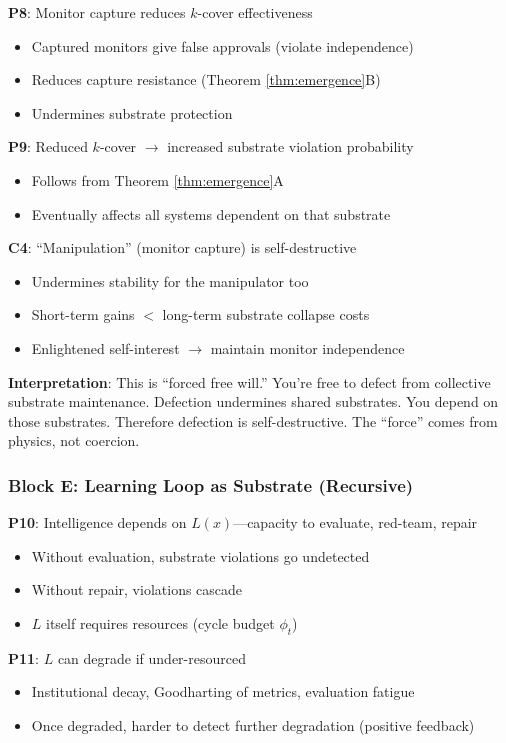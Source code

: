 \documentclass[11pt,a4paper]{article}
\theoremstyle{definition}
\begin{document}
\textbf{P8}: Monitor capture reduces $k$-cover effectiveness
\begin{itemize}
\item Captured monitors give false approvals (violate independence)
\item Reduces capture resistance (Theorem \ref{thm:emergence}B)
\item Undermines substrate protection
\end{itemize}

\textbf{P9}: Reduced $k$-cover $\to$ increased substrate violation probability
\begin{itemize}
\item Follows from Theorem \ref{thm:emergence}A
\item Eventually affects all systems dependent on that substrate
\end{itemize}

\textbf{C4}: ``Manipulation'' (monitor capture) is self-destructive
\begin{itemize}
\item Undermines stability for the manipulator too
\item Short-term gains $<$ long-term substrate collapse costs
\item Enlightened self-interest $\to$ maintain monitor independence
\end{itemize}

\textbf{Interpretation}: This is ``forced free will.'' You're free to defect from collective substrate maintenance. Defection undermines shared substrates. You depend on those substrates. Therefore defection is self-destructive. The ``force'' comes from physics, not coercion.

\subsubsection*{Block E: Learning Loop as Substrate (Recursive)}

\textbf{P10}: Intelligence depends on $L(x)$---capacity to evaluate, red-team, repair
\begin{itemize}
\item Without evaluation, substrate violations go undetected
\item Without repair, violations cascade
\item $L$ itself requires resources (cycle budget $\phi_t$)
\end{itemize}

\textbf{P11}: $L$ can degrade if under-resourced
\begin{itemize}
\item Institutional decay, Goodharting of metrics, evaluation fatigue
\item Once degraded, harder to detect further degradation (positive feedback)
\end{itemize}
\end{document}
